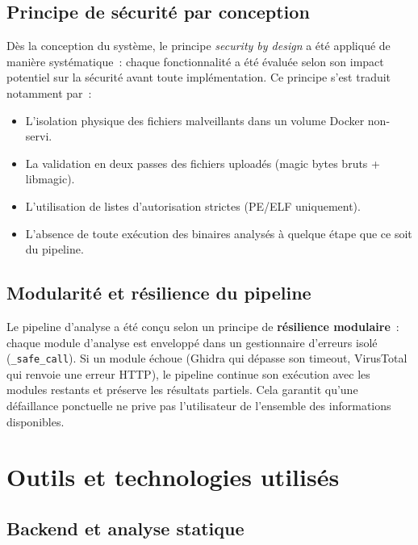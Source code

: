\subsection{Principe de sécurité par conception}

Dès la conception du système, le principe \textit{security by design} a été appliqué de manière systématique~: chaque fonctionnalité a été évaluée selon son impact potentiel sur la sécurité avant toute implémentation. Ce principe s'est traduit notamment par~:
\begin{itemize}
  \item L'isolation physique des fichiers malveillants dans un volume Docker non-servi.
  \item La validation en deux passes des fichiers uploadés (magic bytes bruts + libmagic).
  \item L'utilisation de listes d'autorisation strictes (PE/ELF uniquement).
  \item L'absence de toute exécution des binaires analysés à quelque étape que ce soit du pipeline.
\end{itemize}

\subsection{Modularité et résilience du pipeline}

Le pipeline d'analyse a été conçu selon un principe de \textbf{résilience modulaire}~: chaque module d'analyse est enveloppé dans un gestionnaire d'erreurs isolé (\texttt{\_safe\_call}). Si un module échoue (Ghidra qui dépasse son timeout, VirusTotal qui renvoie une erreur HTTP), le pipeline continue son exécution avec les modules restants et préserve les résultats partiels. Cela garantit qu'une défaillance ponctuelle ne prive pas l'utilisateur de l'ensemble des informations disponibles.

\section{Outils et technologies utilisés}

\subsection{Backend et analyse statique}

